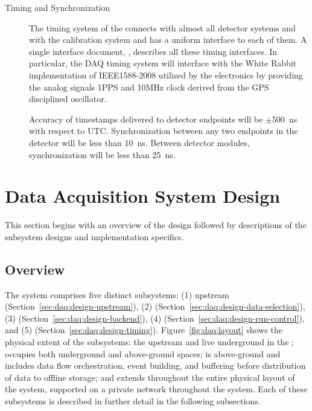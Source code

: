 \begin{description}
\item[Timing and Synchronization] The timing system of the 
   connects with almost all detector systems and with the calibration
  system and has a uniform interface to each of them. 
  A single interface document, , describes all these timing
  interfaces. 
  In particular, the DAQ timing system will interface with the White Rabbit
  implementation of IEEE1588-2008 utilized by the  electronics by providing the analog signals
1PPS and  10MHz clock derived from the GPS disciplined oscillator.

  Accuracy of timestamps delivered to detector endpoints will be
  $\pm$\SI{500}{\nano\second} with respect to UTC.
Synchronization between any two endpoints in the detector will be less than 
\SI{10}{\nano\second}. Between detector modules, synchronization will be less than \SI{25}{\nano\second}.  
\end{description}

\section{Data Acquisition System Design}
\label{sec:daq:design}

This section begins with an overview of the 
design followed by
descriptions of the subsystem designs and implementation specifics.

\subsection{Overview}
\label{sec:daq:design-overview}

The   system comprises five distinct subsystems:
%
(1) upstream  (Section~\ref{sec:daq:design-upstream}),
%
(2)  (Section~\ref{sec:daq:design-data-selection}),
%
(3)  (Section~\ref{sec:daq:design-backend}), 
%
(4)  (Section~\ref{sec:daq:design-run-control}), and
%
(5)  (Section~\ref{sec:daq:design-timing}).
%
Figure~\ref{fig:daq:layout} shows the physical extent of the subsystems: the
upstream  and   live underground in the ;  occupies
both underground and above-ground spaces;  is above-ground
and includes data flow orchestration, event building, and buffering before distribution of data
to offline storage; and  extends throughout the entire physical layout of the
system, supported on a private network throughout the  system. Each of these subsystems is described in further
detail in the following subsections. 



